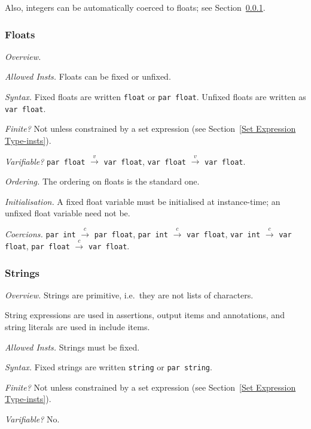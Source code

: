 \documentclass[10pt]{scrartcl}
\newcommand{\TyThing}[1]{\vspace{1.2mm}\noindent\emph{#1} }
\newcommand{\TyOverview}{\TyThing{Overview.}}
\newcommand{\TyInsts}{\TyThing{Allowed Insts.}}
\newcommand{\TySyntax}{\TyThing{Syntax.}}
\newcommand{\TyFiniteType}{\TyThing{Finite?}}
\newcommand{\TyVarifiable}{\TyThing{Varifiable?}}
\newcommand{\TyOrdering}{\TyThing{Ordering.}}
\newcommand{\TyInit}{\TyThing{Initialisation.}}
\newcommand{\TyCoercions}{\TyThing{Coercions.}}
\newcommand{\coerce}[2]{#1 $\stackrel{c}{\rightarrow}$ #2}
\newcommand{\varify}[2]{#1 $\stackrel{v}{\rightarrow}$ #2}
\begin{document}
Also, integers can be automatically coerced to floats;  see
Section~\ref{Floats}.

\subsubsection{Floats}
        \label{Floats}
\TyOverview
\CommonFloatsOverview{}

\TyInsts
Floats can be fixed or unfixed.

\TySyntax
Fixed floats are written \texttt{float} or \texttt{par float}.  Unfixed
floats are written as \texttt{var float}.

\TyFiniteType
Not unless constrained by a set expression (see Section~\ref{Set Expression
Type-insts}).

\TyVarifiable
\varify{\texttt{par float}}{\texttt{var float}},
\varify{\texttt{var float}}{\texttt{var float}}.

\TyOrdering
The ordering on floats is the standard one.

\TyInit
A fixed float variable must be initialised at instance-time;  an unfixed
float variable need not be.

\TyCoercions
\coerce{\texttt{par int}}{\texttt{par float}},
\coerce{\texttt{par int}}{\texttt{var float}},
\coerce{\texttt{var int}}{\texttt{var float}},
\coerce{\texttt{par float}}{\texttt{var float}}.

\subsubsection{Strings}
\TyOverview
Strings are primitive, i.e.~they are not lists of characters.

String expressions are used in assertions, output items and
annotations, and string literals are used in include items.

\TyInsts
Strings must be fixed.

\TySyntax
Fixed strings are written \texttt{string} or \texttt{par string}.

\TyFiniteType
Not unless constrained by a set expression (see Section~\ref{Set Expression
Type-insts}).

\TyVarifiable
No.
\end{document}
